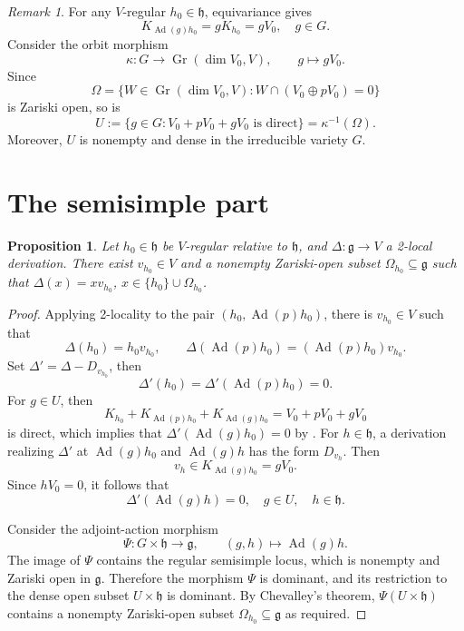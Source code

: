 \documentclass[12pt,reqno]{amsart}
\newtheorem{proposition}[theorem]{Proposition}
\theoremstyle{definition}
\theoremstyle{remark}
\newtheorem{remark}[theorem]{Remark}
\numberwithin{equation}{section}
\newcommand{\g}{\mathfrak{g}}
\newcommand{\tori}{\mathfrak{h}}
\newcommand{\Ad}{\operatorname{Ad}}
\newcommand{\Gr}{\operatorname{Gr}}
\begin{document}
\begin{remark}\label{rem:open-transversality}
For any \(V\)-regular \(h_0\in\tori\), equivariance gives
\[
  K_{\Ad(g)h_0}=gK_{h_0}=gV_0, \quad g\in G.
\]
Consider the orbit morphism
\[
  \kappa\colon G\longrightarrow\Gr(\dim V_0,V),
  \qquad g\longmapsto gV_0.
\]
Since
\[
  \Omega=\{W\in\Gr(\dim V_0,V):W\cap (V_0\oplus pV_0)=0\}
\]
is Zariski open, so is
\[
  U:=\{g\in G:V_0+pV_0+gV_0\text{ is direct}\}
    =\kappa^{-1}(\Omega).
\]
Moreover, \(U\) is nonempty and dense in the irreducible variety \(G\).
\end{remark}

\section{The semisimple part}

\begin{proposition}\label{prop:open-realization}
Let \(h_0\in\tori\) be \(V\)-regular relative to \(\tori\), and
\(\Delta\colon\g\to V\) a 2-local derivation.  There exist \(v_{h_0}\in V\)
and a nonempty Zariski-open subset \(\Omega_{h_0}\subseteq\g\) such that
\(\Delta(x)=xv_{h_0}\), \(x\in \{h_0\}\cup\Omega_{h_0}\).
\end{proposition}

\begin{proof}
Applying 2-locality to the pair \((h_0, \Ad(p)h_0)\), there is
\(v_{h_0}\in V\) such that
\[
  \Delta(h_0)=h_0v_{h_0},\qquad
  \Delta(\Ad(p)h_0)=(\Ad(p)h_0)v_{h_0}.
\]
Set \(\Delta'=\Delta-D_{v_{h_0}}\), then
\[
\Delta'(h_0)=\Delta'(\Ad(p)h_0)=0.
\]
For \(g\in U\), then
\[
  K_{h_0}+ K_{\Ad(p)h_0}+ K_{\Ad(g)h_0}
  =V_0+ pV_0+ gV_0
\]
is direct, which implies that \(\Delta'(\Ad(g)h_0)=0\) by .
For \(h\in\tori\), a derivation realizing \(\Delta'\) at
\(\Ad(g)h_0\) and \(\Ad(g)h\) has the form \(D_{v_h}\). Then
\[
  v_h\in K_{\Ad(g)h_0}=gV_0.
\]
Since \(hV_0=0\), it follows that
\[
  \Delta'(\Ad(g)h)=0, \quad g\in U,\quad h\in\tori.
\]

Consider the adjoint-action morphism
\[
\Psi\colon G\times\tori\longrightarrow\g, \qquad (g,h)\longmapsto\Ad(g)h.
\]
The image of \(\Psi\) contains the regular semisimple locus, which is nonempty and Zariski open in \(\g\). Therefore the morphism \(\Psi\) is dominant, and its restriction to the dense open subset \(U\times\tori\) is dominant. By Chevalley's theorem, \(\Psi(U\times\tori)\) contains a nonempty Zariski-open subset \(\Omega_{h_0}\subseteq\g\) as required.
\end{proof}
\end{document}
